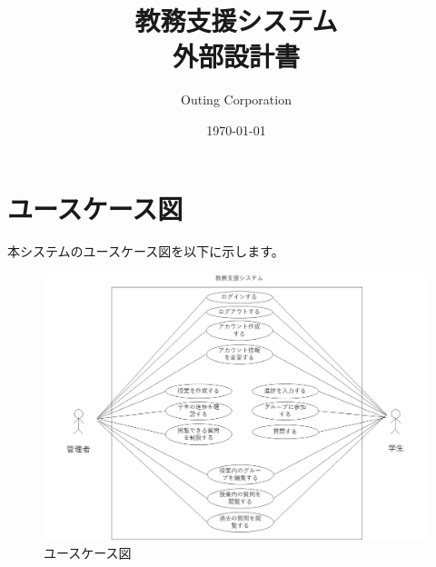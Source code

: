 \documentclass[12pt,a4j]{jarticle}
\title{\Huge 教務支援システム\\外部設計書}
\date{\today}
\author{\large Outing Corporation}
\begin{document}
\maketitle

\newpage

\setcounter{tocdepth}{2}
\tableofcontents

\newpage

\newpage

\newpage

\newpage

\newpage

\newpage


\newpage

\appendix

\section{ユースケース図}
本システムのユースケース図を以下に示します。
\begin{figure}[htbp]
  \begin{center}
    \includegraphics[width=1\linewidth,clip]{./img/usecase.jpg}
    \caption{ユースケース図}\label{fig:usecase}
  \end{center}
\end{figure}
\end{document}
